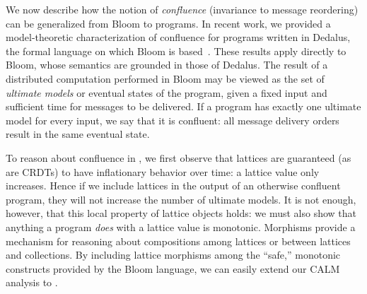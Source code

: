 We now describe how the notion of \emph{confluence} (invariance to message
reordering) can be generalized from Bloom to \lang programs. In recent work, we
provided a model-theoretic characterization of confluence for programs written
in Dedalus, the formal language on which Bloom is based~\cite{dedalus-confluence}. 
These results apply directly to Bloom, whose semantics are grounded in those of
Dedalus.  The result of a distributed computation performed in Bloom may be
viewed as the set of \emph{ultimate models} or eventual states of the program,
given a fixed input and sufficient time for messages to be delivered.  If a
program has exactly one ultimate model for every input, we say that it is
confluent: all message delivery orders result in the same eventual state.

To reason about confluence in \lang, we first observe that lattices are
guaranteed (as are CRDTs) to have inflationary behavior over time: a lattice
value only increases.  Hence if we include lattices in the output of an
otherwise confluent \lang program, they will not increase the number of ultimate
models.  It is not enough, however, that this local property of lattice objects
holds: we must also show that anything a \lang program \emph{does} with a
lattice value is monotonic.  Morphisms provide a mechanism for reasoning about
compositions among lattices or between lattices and collections.  By including
lattice morphisms among the ``safe,'' monotonic constructs provided by the Bloom
language, we can easily extend our CALM analysis to \lang.
